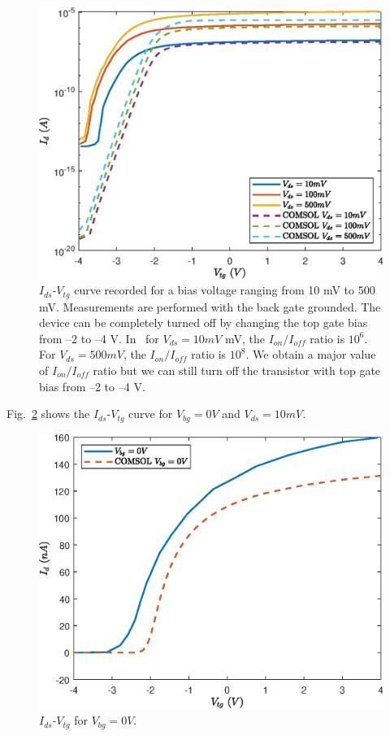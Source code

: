 \documentclass[12pt,a4paper,titlepage]{article}
\begin{document}
\begin{figure}[H]
	\centering
	\includegraphics[width=1\textwidth]{Grafici/Id(Vtg)_HfO2_MoS2_varying_Vds.eps} 
	\caption{$I_{ds}$-$V_{tg}$ curve recorded for a bias voltage ranging from 10 mV to 500 mV. Measurements are performed with the back gate grounded. The device can be completely turned off by changing the top gate bias from –2 to –4 V. In~\cite{Radisavljevic:Si_MoS2} for $V_{ds} = 10 mV$ mV, the $I_{on}/I_{off}$ ratio is $10^6$. For $V_{ds} = 500 mV$, the $I_{on}/I_{off}$ ratio is $10^8$. We obtain a major value of $I_{on}/I_{off}$ ratio but we can still turn off the transistor with top gate bias from –2 to –4 V.}
	\label{fig:Id(Vtg)_HfO2_MoS2_varying_Vds}
\end{figure}

Fig.~\ref{fig:Id(Vtg)_HfO2_MoS2_varying_Vbg} shows the $I_{ds}$-$V_{tg}$ curve for $V_{bg}=0V$ and $V_{ds}=10mV$.

\begin{figure}[H]
	\centering
	\includegraphics[width=1\textwidth]{Grafici/Id(Vtg)_HfO2_MoS2_varying_Vbg.eps} 
	\caption{$I_{ds}$-$V_{tg}$ for $V_{bg}=0V$.}
	\label{fig:Id(Vtg)_HfO2_MoS2_varying_Vbg}
\end{figure}
\end{document}
